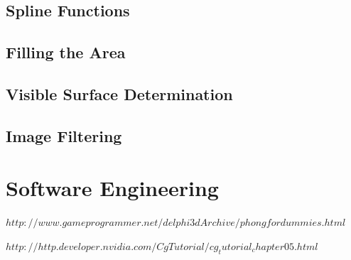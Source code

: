 \documentclass{mini}
\begin{document}
\section{Spline Functions}

\section{Filling the Area}

\section{Visible Surface Determination}

\section{Image Filtering}

\chapter{Software Engineering}


\begin{thebibliography}{1}
 $http://www.gameprogrammer.net/delphi3dArchive/phongfordummies.html$

 $http://http.developer.nvidia.com/CgTutorial/cg_tutorial_chapter05.html$

\end{thebibliography}
\end{document}
